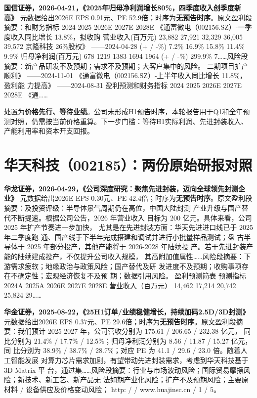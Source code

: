 \textbf{国信证券，2026-04-21，《2025年归母净利润增长80\%，四季度收入创季度新高》}
元数据给出2026E EPS 0.91元、PE 52.9倍；时序为\textbf{无预告时序}。原文盈利段摘要：和财务指标 2024 2025 2026E 2027E 2028E 《通富微电（002156.SZ）-一季度收入同比增长 13.8\%，拟收购 营业收入(百万元) 23,882 27,921 32,329 36,005 39,572 京隆科技 26\%股权》 ——2024-04-28 (+ / -\%) 7.2\% 16.9\% 15.8\% 11.4\% 9.9\% 归母净利润(百万元) 678 1219 1383 1694 1964 (+ / -\%) 299.9\% 7……风险段摘要：新产品研发不及预期；需求不及预期；大客户集中的风险。 二期项目扩产顺利》 ——2024-11-01 《通富微电（002156.SZ）-上半年收入同比增长 11.8\%，盈利能 力提高》 ——2024-08-31 盈利预测和财务指标 2024 2025 2026E 2027E 2028E 《通……

\begin{keyinsight}[AStock处理]
处置为\textbf{价格先行、等待业绩}。公司未形成H1预告时序，本轮报告用于Q1和全年预测对照，仍需按当前价格重算。下一步门槛：等待H1实际利润、先进封装收入、产能利用率和资本开支回报。
\end{keyinsight}

\section{华天科技（002185）：两份原始研报对照}

\textbf{华龙证券，2026-04-29，《公司深度研究：聚焦先进封装，迈向全球领先封测企业》}
元数据给出2026E EPS 0.30元、PE 42.4倍；时序为\textbf{无预告时序}。原文盈利段摘要：及投资评级：半导体景气周期仍在高位，中国大陆封测 产业升级与国产替代不断提速。根据公司公告，2026 年营业收入 目标为 200 亿元。具体来看，公司 2025 年扩产节奏进一步加快， 尤其是在先进封装方面：华天先进进口线已于 2025 年二季度跑 通、国产线于下半年完成搭建和调试并进行小批量样品测试；盘 古半导体于 2025 年部分投产，其他产能将于 2026-2028 年陆续投 产。若干先进封装产能的陆续建成投产，不仅提升公司收入规模， 其高附加值属性……风险段摘要：下游需求疲软；地缘政治与政策风险；国产替代及研 发进度不及预期；收购事项存在不确定性；宏观经济恢复不及预 期；数据引用风险。 盈利预测简表 预测指标 2024A 2025A 2026E 2027E 2028E 营业收入（百万元） 14,462 17,214 20,742 25,824 29……

\textbf{华金证券，2025-08-22，《25H1订单/业绩稳健增长，持续加码2.5D/3D封测》}
元数据给出2026E EPS 0.37元、PE 29.6倍；时序为\textbf{无预告时序}。原文盈利段摘要：我们预计 2025-2027 年，公司营收分别为 175.61 / 206.65 / 232.38 亿元， 同比分别为 21.4\% / 17.7\% / 12.5\%；归母净利润分别为 8.56 / 11.87 / 15.27 亿元，同 比分别为 38.9\% / 38.7\% / 28.7\%；对应 PE 为 41.1 / 29.6 / 23.0 倍。随着人工智能发展 对算力芯片需求加剧，有望带动先进封装需求，考虑到华天科技基于 3D Matrix 平 台，通过集……风险段摘要：行业与市场波动风险；国际贸易摩擦风险；新技术、新工艺、新产品无 法如期产业化风险；扩产不及预期风险；主要原材料 / 设备供应及价格变动风险； http: / / www.huajinsc.cn / 1 / 5。

